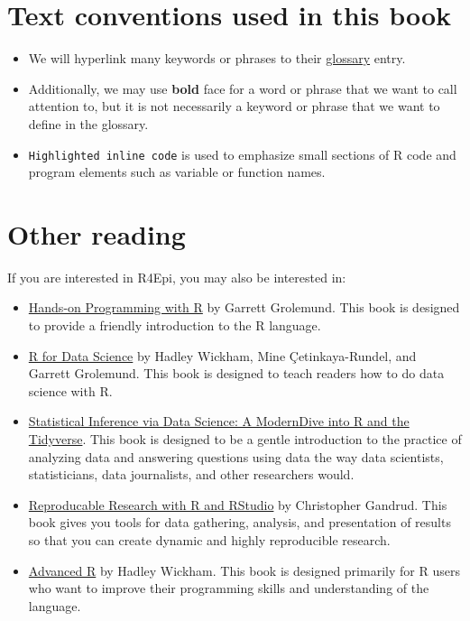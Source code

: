 \documentclass[
  letterpaper,
  DIV=11,
  numbers=noendperiod]{scrreprt}
\providecommand{\tightlist}{%
  \setlength{\itemsep}{0pt}\setlength{\parskip}{0pt}}\usepackage{longtable,booktabs,array}
\begin{document}
\section*{Text conventions used in this
book}\label{text-conventions-used-in-this-book}


\begin{itemize}
\tightlist
\item
  We will hyperlink many keywords or phrases to their
  \href{appendices/glossary.qmd}{glossary} entry.
\item
  Additionally, we may use \textbf{bold} face for a word or phrase that
  we want to call attention to, but it is not necessarily a keyword or
  phrase that we want to define in the glossary.
\item
  \texttt{Highlighted\ inline\ code} is used to emphasize small sections
  of R code and program elements such as variable or function names.
\end{itemize}

\section*{Other reading}\label{other-reading}


If you are interested in R4Epi, you may also be interested in:

\begin{itemize}
\item
  \href{https://rstudio-education.github.io/hopr/}{Hands-on Programming
  with R} by Garrett Grolemund. This book is designed to provide a
  friendly introduction to the R language.
\item
  \href{https://r4ds.hadley.nz/}{R for Data Science} by Hadley Wickham,
  Mine Çetinkaya-Rundel, and Garrett Grolemund. This book is designed to
  teach readers how to do data science with R.
\item
  \href{https://moderndive.com/}{Statistical Inference via Data Science:
  A ModernDive into R and the Tidyverse}. This book is designed to be a
  gentle introduction to the practice of analyzing data and answering
  questions using data the way data scientists, statisticians, data
  journalists, and other researchers would.
\item
  \href{http://christophergandrud.github.io/RepResR-RStudio/}{Reproducable
  Research with R and RStudio} by Christopher Gandrud. This book gives
  you tools for data gathering, analysis, and presentation of results so
  that you can create dynamic and highly reproducible research.
\item
  \href{https://adv-r.hadley.nz/}{Advanced R} by Hadley Wickham. This
  book is designed primarily for R users who want to improve their
  programming skills and understanding of the language.
\end{itemize}
\end{document}
